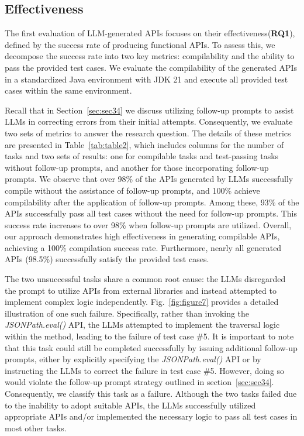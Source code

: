 \subsection{Effectiveness}
\label{sec:sec42}
The first evaluation of LLM-generated APIs focuses on their effectiveness(\textbf{RQ1}), defined by the success rate of producing functional APIs. To assess this, we decompose the success rate into two key metrics: compilability and the ability to pass the provided test cases. We evaluate the compilability of the generated APIs in a standardized Java environment with JDK 21 and execute all provided test cases within the same environment.

Recall that in Section~\ref{sec:sec34} we discuss utilizing follow-up prompts to assist LLMs in correcting errors from their initial attempts. Consequently, we evaluate two sets of metrics to answer the research question. The details of these metrics are presented in Table~\ref{tab:table2}, which includes columns for the number of tasks and two sets of results: one for compilable tasks and test-passing tasks without follow-up prompts, and another for those incorporating follow-up prompts. We observe that over 98\% of the APIs generated by LLMs successfully compile without the assistance of follow-up prompts, and 100\% achieve compilability after the application of follow-up prompts. Among these, 93\% of the APIs successfully pass all test cases without the need for follow-up prompts. This success rate increases to over 98\% when follow-up prompts are utilized. Overall, our approach demonstrates high effectiveness in generating compilable APIs, achieving a 100\% compilation success rate. Furthermore, nearly all generated APIs (98.5\%) successfully satisfy the provided test cases.

The two unsuccessful tasks share a common root cause: the LLMs disregarded the prompt to utilize APIs from external libraries and instead attempted to implement complex logic independently. Fig.~\ref{fig:figure7} provides a detailed illustration of one such failure. Specifically, rather than invoking the \textit{JSONPath.eval()} API, the LLMs attempted to implement the traversal logic within the method, leading to the failure of test case \#5. It is important to note that this task could still be completed successfully by issuing additional follow-up prompts, either by explicitly specifying the \textit{JSONPath.eval()} API or by instructing the LLMs to correct the failure in test case \#5. However, doing so would violate the follow-up prompt strategy outlined in section~\ref{sec:sec34}. Consequently, we classify this task as a failure. Although the two tasks failed due to the inability to adopt suitable APIs, the LLMs successfully utilized appropriate APIs and/or implemented the necessary logic to pass all test cases in most other tasks.


